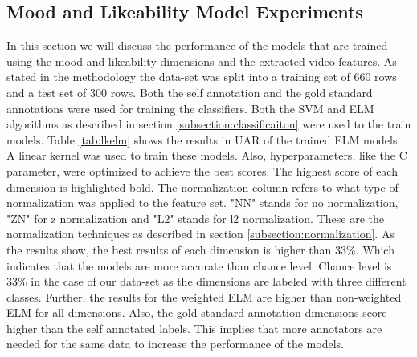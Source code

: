\subsection{Mood and Likeability Model Experiments}
In this section we will discuss the performance of the models that are trained using the mood and likeability dimensions and the extracted video features. As stated in the methodology the data-set was split into a training set of 660 rows and a test set of 300 rows. Both the self annotation and the gold standard annotations were used for training the classifiers. Both the SVM and ELM algorithms as described in section \ref{subsection:classificaiton} were used to the train models. Table \ref{tab:lkelm} shows the results in UAR of the trained ELM models. A linear kernel was used to train these models. Also, hyperparameters, like the C parameter, were optimized to achieve the best scores. The highest score of each dimension is highlighted bold. The normalization column refers to what type of normalization was applied to the feature set. "NN" stands for no normalization, "ZN" for z normalization and "L2" stands for l2 normalization. These are the normalization techniques as described in section \ref{subsection:normalization}. As the results show, the best results of each dimension is higher than 33\%. Which indicates that the models are more accurate than chance level. Chance level is 33\% in the case of our data-set as the dimensions are labeled with three different classes. Further, the results for the weighted ELM are higher than non-weighted ELM for all dimensions. Also, the gold standard annotation dimensions score higher than the self annotated labels. This implies that more annotators are needed for the same data to increase the performance of the models. 

